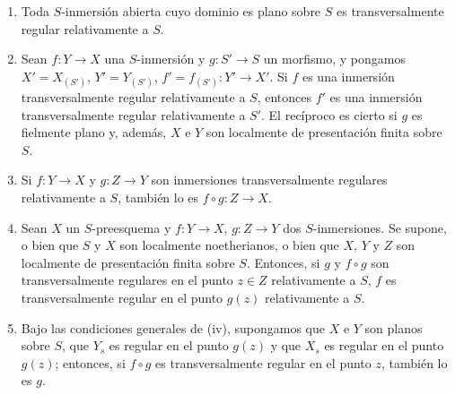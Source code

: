 \begin{proposition}[19.2.7]
\label{IV.19.2.7}
\begin{enumerate}
  \item[\textup{(i)}] Toda $S$-inmersión abierta cuyo dominio es plano sobre $S$ es transversalmente regular relativamente a $S$.
  \item[\textup{(ii)}] Sean $f:Y\to X$ una $S$-inmersión y $g:S'\to S$ un morfismo, y pongamos $X'=X_{(S')}$, $Y'=Y_{(S')}$, $f'=f_{(S')}:Y'\to X'$. Si $f$ es una inmersión transversalmente regular relativamente a $S$, entonces $f'$ es una inmersión transversalmente regular relativamente a $S'$. El recíproco es cierto si $g$ es fielmente plano y, además, $X$ e $Y$ son localmente de presentación finita sobre $S$.
  \item[\textup{(iii)}] Si $f:Y\to X$ y $g:Z\to Y$ son inmersiones transversalmente regulares relativamente a $S$, también lo es $f\circ g:Z\to X$.
  \item[\textup{(iv)}] Sean $X$ un $S$-preesquema y $f:Y\to X$, $g:Z\to Y$ dos $S$-inmersiones. Se supone, o bien que $S$ y $X$ son localmente noetherianos, o bien que $X$, $Y$ y $Z$ son localmente de presentación finita sobre $S$. Entonces, si $g$ y $f\circ g$ son transversalmente regulares en el punto $z\in Z$ relativamente a $S$, $f$ es transversalmente regular en el punto $g(z)$ relativamente a $S$.
  \item[\textup{(v)}] Bajo las condiciones generales de \textup{(iv)}, supongamos que $X$ e $Y$ son planos sobre $S$, que $Y_s$ es regular en el punto $g(z)$ y que $X_s$ es regular en el punto $g(z)$; entonces, si $f\circ g$ es transversalmente regular en el punto $z$, también lo es $g$.
\end{enumerate}
\end{proposition}

